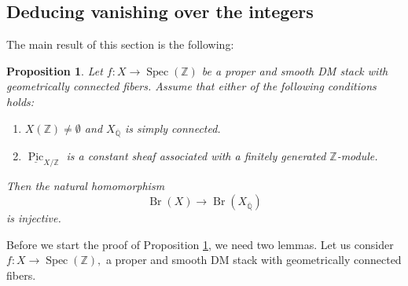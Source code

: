\documentclass{amsart}
\newtheorem{prop}{Proposition}[section]
\theoremstyle{definition}
\theoremstyle{remark}
\DeclareMathOperator{\Spec}{Spec}
\DeclareMathOperator{\Br}{Br}
\DeclareMathOperator{\Pic}{Pic}
\newcommand{\Q}{\mathbb{Q}}
\newcommand{\ZZ}{\mathbb Z}
\begin{document}
\subsection{Deducing vanishing over the integers}\label{Subsection:Deducing vanishing over the integers}

The main result of this section is the following:
\begin{prop}\label{Proposition: deducing vanishing over Z}
    Let $f\colon X\rightarrow \Spec(\ZZ)$ be a proper and smooth DM stack with geometrically connected fibers.
    Assume that either of the following conditions holds:
    \begin{enumerate}
        \item $X(\ZZ)\neq \emptyset$ and $X_{\overline{\Q}}$ is simply connected.
        \item $\underline{\Pic}_{X/\ZZ}$ is a constant sheaf associated with a finitely generated $\ZZ$-module.
    \end{enumerate}
    Then the natural homomorphism
    \[
    \Br(X) \to \Br(X_{\overline{\Q}})
    \]
    is injective.
\end{prop}





Before we start the proof of Proposition \ref{Proposition: deducing vanishing over Z}, we need two lemmas.
Let us consider $f\colon X\rightarrow \Spec(\ZZ),$ a proper and smooth DM stack with geometrically connected fibers.
\end{document}
